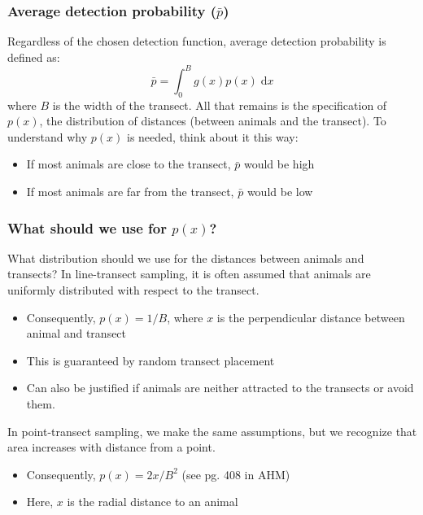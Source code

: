 \documentclass[color=usenames,dvipsnames]{beamer}\usepackage[]{graphicx}\usepackage[]{xcolor}
\begin{document}
\begin{frame}
  \frametitle{Average detection probability ($\bar{p}$)}
  Regardless of the chosen detection function, average detection
  probability is defined as: 
  \[
     \bar{p} = \int_{0}^{B} g(x)p(x) \; \mathrm{d}x
   \]
   where $B$ is the width of the transect.
  \pause
  \vfill
  All that remains is the specification of $p(x)$, the
  distribution of distances (between animals and the transect).
  \pause
  \vfill
  To understand why $p(x)$ is needed, think about it this way:
  \begin{itemize}
    \item If most animals are close to the transect, $\bar{p}$ would
      be high
    \item If most animals are far from the transect, $\bar{p}$ would
      be low
  \end{itemize}
\end{frame}



\begin{frame}
  \frametitle{What should we use for $p(x)$?}
  What distribution should we use for the distances between animals
  and transects?
  \pause
  \vfill
  In \alert{line-transect sampling}, it is often assumed that animals
  are uniformly distributed with respect to the transect.
  \begin{itemize}
    \item Consequently, $p(x) = 1/B$, where $x$ is the
      \alert{perpendicular} distance between animal and transect
    \item This is guaranteed by random transect placement
    \item Can also be justified if animals are neither attracted to
      the transects or avoid them. 
  \end{itemize}
  \pause
  \vfill
  In \alert{point-transect sampling}, we make the same assumptions,
  but we recognize that area increases with distance from a point.
  \begin{itemize}
    \item Consequently, $p(x) = 2x/B^2$ (see pg. 408 in AHM)
    \item Here, $x$ is the \alert{radial} distance to an animal
  \end{itemize}
\end{frame}
\end{document}
